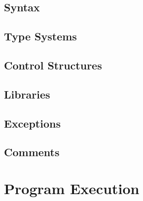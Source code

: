 

\subsection{Syntax}


\subsection{Type Systems}


\subsection{Control Structures}


\subsection{Libraries}


\subsection{Exceptions}


\subsection{Comments}


\toclineskip
\section{Program Execution}


